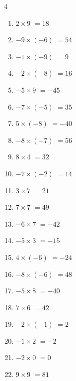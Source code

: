 \begin{multicols}{4}
\begin{enumerate}
  \item $2\times 9$
        $=18$

  \item $-9\times (-6)$
        $=54$

  \item $-1\times (-9)$
        $=9$

  \item $-2\times (-8)$
        $=16$

  \item $-5\times 9$
        $=-45$

  \item $-7\times (-5)$
        $=35$

  \item $5\times (-8)$
        $=-40$

  \item $-8\times (-7)$
        $=56$

  \item $8\times 4$
        $=32$

  \item $-7\times (-2)$
        $=14$

  \item $3\times 7$
        $=21$

  \item $7\times 7$
        $=49$

  \item $-6\times 7$
        $=-42$

  \item $-5\times 3$
        $=-15$

  \item $4\times (-6)$
        $=-24$

  \item $-8\times (-6)$
        $=48$

  \item $-5\times 8$
        $=-40$

  \item $7\times 6$
        $=42$

  \item $-2\times (-1)$
        $=2$

  \item $-1\times 2$
        $=-2$

  \item $-2\times 0$
        $=0$

  \item $9\times 9$
        $=81$

\columnbreak %


\end{enumerate}
\end{multicols}
